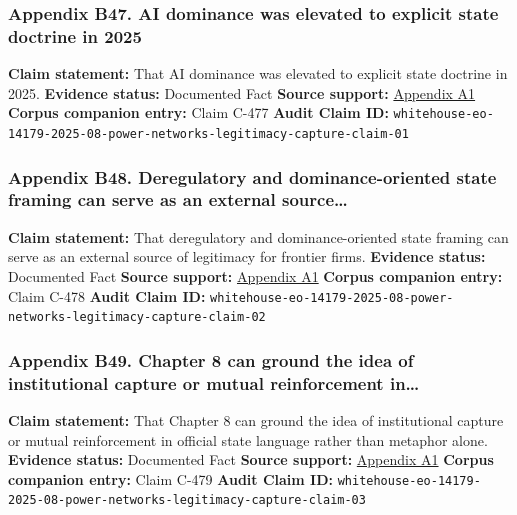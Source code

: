 \documentclass[
  american,
  11pt,
  letterpaper,
]{article}
\begin{document}
\subsubsection{Appendix B47. AI dominance was elevated to explicit state
doctrine in
2025}\label{ch-07-appendix-b47-ai-dominance-was-elevated-to-explicit-state-doctrine-in-2025}

\textbf{Claim statement:} That AI dominance was elevated to explicit
state doctrine in 2025. \textbf{Evidence status:} Documented Fact
\textbf{Source support:}
\hyperref[ch-07-appendix-a1-removing-barriers-to-american-leadership-in-artificial-intelligence]{Appendix
A1} \textbf{Corpus companion entry:} Claim C-477 \textbf{Audit Claim
ID:}
\texttt{whitehouse-eo-14179-2025-08-power-networks-legitimacy-capture-claim-01}

\subsubsection{Appendix B48. Deregulatory and dominance-oriented state
framing can serve as an external
source\ldots{}}\label{ch-07-appendix-b48-deregulatory-and-dominance-oriented-state-framing-can-serve-as-an-external-source}

\textbf{Claim statement:} That deregulatory and dominance-oriented state
framing can serve as an external source of legitimacy for frontier
firms. \textbf{Evidence status:} Documented Fact \textbf{Source
support:}
\hyperref[ch-07-appendix-a1-removing-barriers-to-american-leadership-in-artificial-intelligence]{Appendix
A1} \textbf{Corpus companion entry:} Claim C-478 \textbf{Audit Claim
ID:}
\texttt{whitehouse-eo-14179-2025-08-power-networks-legitimacy-capture-claim-02}

\subsubsection{Appendix B49. Chapter 8 can ground the idea of
institutional capture or mutual reinforcement
in\ldots{}}\label{ch-07-appendix-b49-chapter-8-can-ground-the-idea-of-institutional-capture-or-mutual-reinforcement-in}

\textbf{Claim statement:} That Chapter 8 can ground the idea of
institutional capture or mutual reinforcement in official state language
rather than metaphor alone. \textbf{Evidence status:} Documented Fact
\textbf{Source support:}
\hyperref[ch-07-appendix-a1-removing-barriers-to-american-leadership-in-artificial-intelligence]{Appendix
A1} \textbf{Corpus companion entry:} Claim C-479 \textbf{Audit Claim
ID:}
\texttt{whitehouse-eo-14179-2025-08-power-networks-legitimacy-capture-claim-03}
\end{document}
